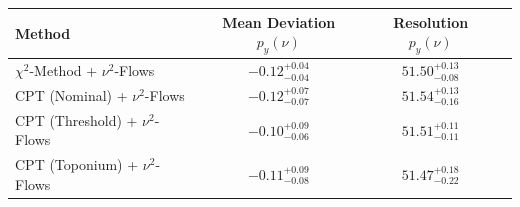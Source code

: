     \begin{tabular}{lccc}
        \toprule
        Method & Mean Deviation $p_{y}(\nu)$ & Resolution $p_{y}(\nu)$ \\
        \midrule
        $\chi^2$-Method + $\nu^2$-Flows & $-0.12^{+0.04}_{-0.04}$ & $51.50^{+0.13}_{-0.08}$ \\
        CPT (Nominal) + $\nu^2$-Flows & $-0.12^{+0.07}_{-0.07}$ & $51.54^{+0.13}_{-0.16}$ \\
        CPT (Threshold) + $\nu^2$-Flows & $-0.10^{+0.09}_{-0.06}$ & $51.51^{+0.11}_{-0.11}$ \\
        CPT (Toponium) + $\nu^2$-Flows & $-0.11^{+0.09}_{-0.08}$ & $51.47^{+0.18}_{-0.22}$ \\
        \bottomrule
    \end{tabular}